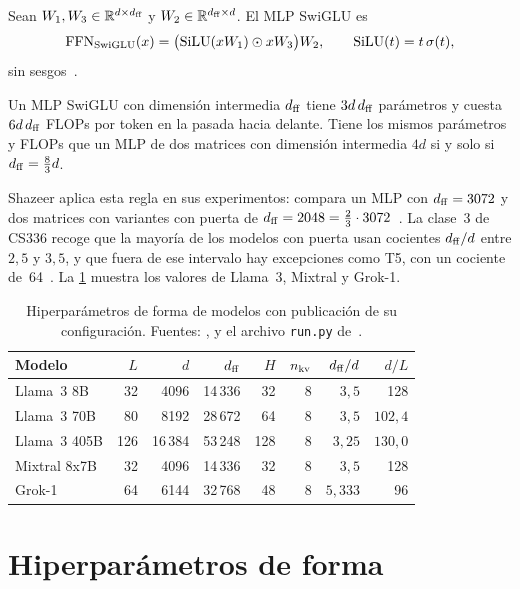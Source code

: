\begin{definicion}\label{def:swiglu}
Sean $W_1,W_3\in\mathbb{R}^{d\times d_{\mathrm{ff}}}$ y $W_2\in\mathbb{R}^{d_{\mathrm{ff}}\times d}$. El MLP SwiGLU es
\[
\operatorname{FFN}_{\operatorname{SwiGLU}}(x)=\bigl(\operatorname{SiLU}(xW_1)\odot xW_3\bigr)W_2,\qquad \operatorname{SiLU}(t)=t\,\sigma(t),
\]
sin sesgos~\cite[ec.~6]{shazeerglu}.
\end{definicion}

\begin{proposicion}\label{prop:presupuesto}
Un MLP SwiGLU con dimensión intermedia $d_{\mathrm{ff}}$ tiene $3d\,d_{\mathrm{ff}}$ parámetros y cuesta $6d\,d_{\mathrm{ff}}$ FLOPs por token en la pasada hacia delante. Tiene los mismos parámetros y FLOPs que un MLP de dos matrices con dimensión intermedia $4d$ si y solo si $d_{\mathrm{ff}}=\frac83 d$.
\end{proposicion}

Shazeer aplica esta regla en sus experimentos: compara un MLP con $d_{\mathrm{ff}}=3072$ y dos matrices con variantes con puerta de $d_{\mathrm{ff}}=2048=\frac23\cdot 3072$~\cite[§3.1]{shazeerglu}. La clase~3 de CS336 recoge que la mayoría de los modelos con puerta usan cocientes $d_{\mathrm{ff}}/d$ entre $2{,}5$ y $3{,}5$, y que fuera de ese intervalo hay excepciones como T5, con un cociente de~64~\cite{cs336}. La \cref{tab:hiper} muestra los valores de Llama~3, Mixtral y Grok-1.

\begin{table}[ht]
\centering\small
\caption{Hiperparámetros de forma de modelos con publicación de su configuración. Fuentes: \cite[tabla~3]{llama3}, \cite[tabla~1]{mixtral} y el archivo \texttt{run.py} de~\cite{grok1}.}\label{tab:hiper}
\begin{tabular}{@{}lrrrrrrr@{}}
\toprule
Modelo & $L$ & $d$ & $d_{\mathrm{ff}}$ & $H$ & $n_{\mathrm{kv}}$ & $d_{\mathrm{ff}}/d$ & $d/L$ \\
\midrule
Llama~3 8B & 32 & 4096 & 14\,336 & 32 & 8 & $3{,}5$ & 128 \\
Llama~3 70B & 80 & 8192 & 28\,672 & 64 & 8 & $3{,}5$ & $102{,}4$ \\
Llama~3 405B & 126 & 16\,384 & 53\,248 & 128 & 8 & $3{,}25$ & $130{,}0$ \\
Mixtral 8x7B & 32 & 4096 & 14\,336 & 32 & 8 & $3{,}5$ & 128 \\
Grok-1 & 64 & 6144 & 32\,768 & 48 & 8 & $5{,}333$ & 96 \\
\bottomrule
\end{tabular}
\end{table}

\section{Hiperparámetros de forma}

